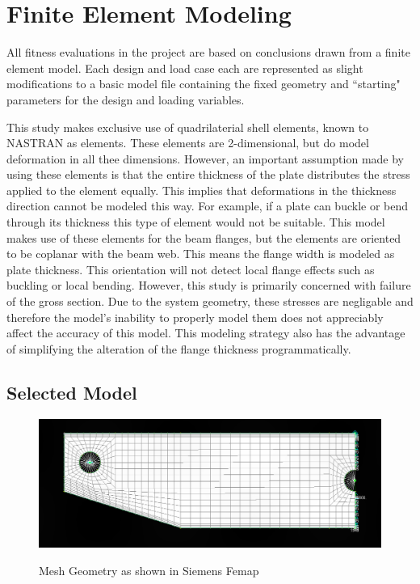 \section{Finite Element Modeling}

All fitness evaluations in the project are based on conclusions drawn from a finite element model. Each design and load case each are represented as slight modifications to a basic model file containing the fixed geometry and ``starting" parameters for the design and loading variables.  

This study makes exclusive use of quadrilaterial shell elements, known to NASTRAN as  elements. These elements are 2-dimensional, but do model deformation in all thee dimensions. However, an important assumption made by using these elements is that the entire thickness of the plate distributes the stress applied to the element equally. This implies that deformations in the thickness direction cannot be modeled this way. For example, if a plate can buckle or bend through its thickness this type of element would not be suitable. This model makes use of these elements for the beam flanges, but the elements are oriented to be coplanar with the beam web. This means the flange width is modeled as plate thickness. This orientation will not detect local flange effects such as buckling or local bending. However, this study is primarily concerned with failure of the gross section. Due to the system geometry, these stresses are negligable and therefore the model's inability to properly model them does not appreciably affect the accuracy of this model. This modeling strategy also has the advantage of simplifying the alteration of the flange thickness programmatically. 

\subsection{Selected Model}

\begin{figure}
\includegraphics[width=\textwidth]{img/mesh_geom.png}
\label{img:mesh_geom}
\caption{Mesh Geometry as shown in Siemens Femap}
\end{figure}
